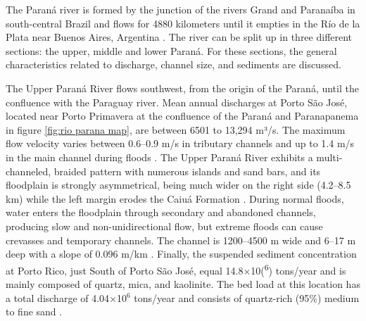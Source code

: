 
The Paraná river is formed by the junction of the rivers Grand and Paranaíba in south-central Brazil and flows for 4880 kilometers until it empties in the Río de la Plata near Buenos Aires, Argentina \autocite{orfeoHydraulicMorphologicalCharacteristics2002}. The river can be split up in three different sections: the upper, middle and lower Paraná. For these sections, the general characteristics related to discharge, channel size, and sediments are discussed.

The Upper Paraná River flows southwest, from the origin of the Paraná, until the confluence with the Paraguay river. Mean annual discharges at Porto São José, located near Porto Primavera at the confluence of the Paraná and Paranapanema in figure \ref{fig:rio parana map}, are between 6501 to 13,294 m³/s. The maximum flow velocity varies between 0.6–0.9 m/s in tributary channels and up to 1.4 m/s in the main channel during floods \autocite{stevauxUpperParanaRiver1994}. The Upper Paraná River exhibits a multi-channeled, braided pattern with numerous islands and sand bars, and its floodplain is strongly asymmetrical, being much wider on the right side (4.2–8.5 km) while the left margin erodes the Caiuá Formation \autocite{orfeoHydraulicMorphologicalCharacteristics2002}. During normal floods, water enters the floodplain through secondary and abandoned channels, producing slow and non-unidirectional flow, but extreme floods can cause crevasses and temporary channels. The channel is 1200–4500 m wide and 6–17 m deep with a slope of 0.096 m/km \autocite{stevauxUpperParanaRiver1994}. Finally, the suspended sediment concentration at Porto Rico, just South of Porto São José, equal 14.8×10(\textsuperscript{6}) tons/year and is mainly composed of quartz, mica, and kaolinite. The bed load at this location has a total discharge of 4.04×10$^6$ tons/year and consists of quartz-rich (95\%) medium to fine sand \autocite{stevauxUpperParanaRiver1994}.

